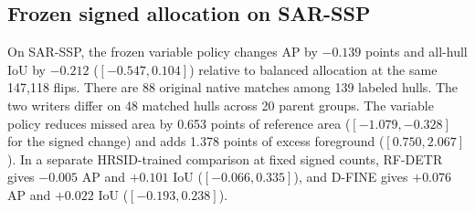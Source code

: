 \subsection{Frozen signed allocation on SAR-SSP}
\label{sec:sar-ssp}
On SAR-SSP, the frozen variable policy changes AP by \(-0.139\) points and all-hull IoU by \(-0.212\) (\([-0.547,0.104]\)) relative to balanced allocation at the same 147,118 flips. There are 88 original native matches among 139 labeled hulls. The two writers differ on 48 matched hulls across 20 parent groups. The variable policy reduces missed area by 0.653 points of reference area (\([-1.079,-0.328]\) for the signed change) and adds 1.378 points of excess foreground (\([0.750,2.067]\)). In a separate HRSID-trained comparison at fixed signed counts, RF-DETR gives \(-0.005\) AP and \(+0.101\) IoU (\([-0.066,0.335]\)), and D-FINE gives \(+0.076\) AP and \(+0.022\) IoU (\([-0.193,0.238]\)).
